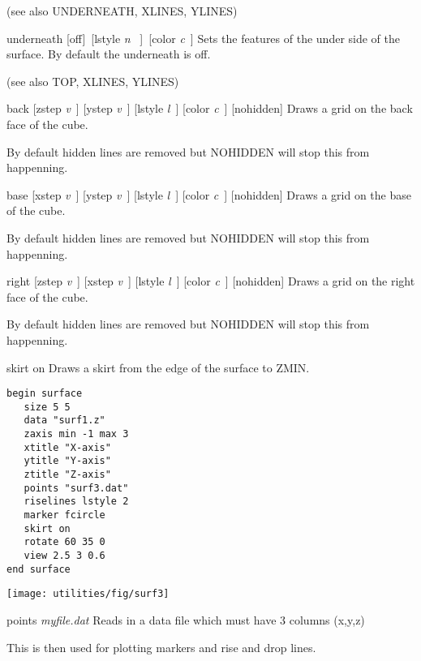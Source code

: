 \begin{commanddescription}
(see also {\sf UNDERNEATH, XLINES, YLINES})

\item[{\sf underneath [off]\ [lstyle {\it n} \ ]\ [color {\it c}\ ] }]
Sets the features of the under side of the surface.
By default the underneath is off.

(see also TOP, XLINES, YLINES)

\item[{\sf back [zstep {\it v}\ ] [ystep {\it v}\ ] [lstyle {\it l}\ ] [color {\it c}\ ] [nohidden] }]
Draws a grid on the back face of the cube.

By default hidden lines are removed but {\sf NOHIDDEN} will
stop this from happenning.

\item[{\sf base [xstep {\it v}\ ] [ystep {\it v}\ ] [lstyle {\it l}\ ] [color {\it c}\ ] [nohidden] }]
Draws a grid on the base of the cube.

By default hidden lines are removed but {\sf NOHIDDEN} will
stop this from happenning.

\item[{\sf right [zstep {\it v}\ ] [xstep {\it v}\ ] [lstyle {\it l}\ ] [color {\it c}\ ] [nohidden] }]
Draws a grid on the right face of the cube.

By default hidden lines are removed but {\sf NOHIDDEN} will
stop this from happenning.

\item[{\sf skirt on}]
Draws a skirt from the edge of the surface to {\sf ZMIN}.

\begin{minipage}[c]{8cm}
\begin{Verbatim}
begin surface
   size 5 5 
   data "surf1.z"
   zaxis min -1 max 3
   xtitle "X-axis"
   ytitle "Y-axis"
   ztitle "Z-axis"
   points "surf3.dat"
   riselines lstyle 2
   marker fcircle
   skirt on
   rotate 60 35 0
   view 2.5 3 0.6
end surface
\end{Verbatim}
\end{minipage}
\hfill
\begin{minipage}[c]{7cm}
\mbox{\texttt{[image: utilities/fig/surf3]}}
\end{minipage}

\item[{\sf points {\it myfile.dat} }]
Reads in a data file which must have 3 columns (x,y,z)

This is then used for plotting markers and
rise and drop lines.


\end{commanddescription}
